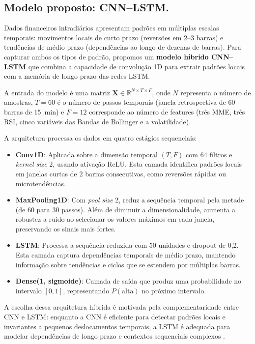 \subsection{Modelo proposto: CNN--LSTM.}
Dados financeiros intradiários apresentam padrões em múltiplas escalas temporais: movimentos locais de curto prazo (reversões em 2--3 barras) e tendências de médio prazo (dependências ao longo de dezenas de barras).
Para capturar ambos os tipos de padrão, propomos um \textbf{modelo híbrido CNN--LSTM} que combina a capacidade de convolução 1D para extrair padrões locais com a memória de longo prazo das redes LSTM.

A entrada do modelo é uma matriz $\mathbf{X} \in \mathbb{R}^{N \times T \times F}$, onde $N$ representa o número de amostras, $T=60$ é o número de passos temporais (janela retrospectiva de 60 barras de 15~min) e $F=12$ corresponde ao número de features (três MME, três RSI, cinco variáveis das Bandas de Bollinger e a volatilidade).

A arquitetura processa os dados em quatro estágios sequenciais:

\begin{itemize}
  \item \textbf{Conv1D}: Aplicada sobre a dimensão temporal $(T, F)$ com 64 filtros e \emph{kernel size} 2, usando ativação ReLU.
        Esta camada identifica padrões locais em janelas curtas de 2 barras consecutivas, como reversões rápidas ou microtendências.
        
  \item \textbf{MaxPooling1D}: Com \emph{pool size} 2, reduz a sequência temporal pela metade (de 60 para 30 passos).
        Além de diminuir a dimensionalidade, aumenta a robustez a ruído ao selecionar os valores máximos em cada janela, preservando os sinais mais fortes.
        
  \item \textbf{LSTM}: Processa a sequência reduzida com 50 unidades e dropout de 0,2.
        Esta camada captura dependências temporais de médio prazo, mantendo informação sobre tendências e ciclos que se estendem por múltiplas barras.
        
  \item \textbf{Dense(1, sigmoide)}: Camada de saída que produz uma probabilidade no intervalo $[0,1]$, representando $P(\text{alta})$ no próximo intervalo.
\end{itemize}

A escolha dessa arquitetura híbrida é motivada pela complementaridade entre CNN e LSTM: enquanto a CNN é eficiente para detectar padrões locais e invariantes a pequenos deslocamentos temporais, a LSTM é adequada para modelar dependências de longo prazo e contextos sequenciais complexos \cite{borovykh_2017}.

